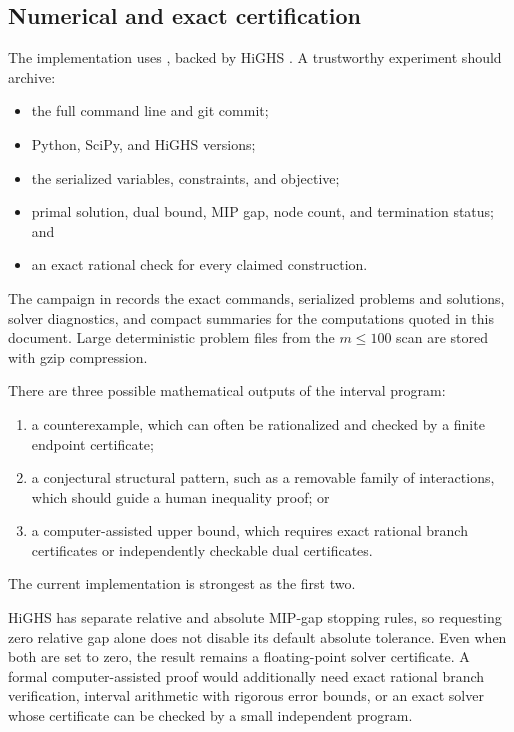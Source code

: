 \subsection{Numerical and exact certification}

The implementation uses , backed by HiGHS
\cite{SciPy2020,HiGHS2020}.  A trustworthy experiment should archive:
\begin{itemize}
    \item the full command line and git commit;
    \item Python, SciPy, and HiGHS versions;
    \item the serialized variables, constraints, and objective;
    \item primal solution, dual bound, MIP gap, node count, and termination
          status; and
    \item an exact rational check for every claimed construction.
\end{itemize}

The campaign in  records the exact
commands, serialized problems and solutions, solver diagnostics, and compact
summaries for the computations quoted in this document.  Large deterministic
problem files from the \(m\leq100\) scan are stored with gzip compression.

There are three possible mathematical outputs of the interval program:
\begin{enumerate}
    \item a counterexample, which can often be rationalized and checked by a
          finite endpoint certificate;
    \item a conjectural structural pattern, such as a removable family of
          interactions, which should guide a human inequality proof; or
    \item a computer-assisted upper bound, which requires exact rational
          branch certificates or independently checkable dual certificates.
\end{enumerate}
The current implementation is strongest as the first two.

HiGHS has separate relative and absolute MIP-gap stopping rules, so requesting
zero relative gap alone does not disable its default absolute tolerance.  Even
when both are set to zero, the result remains a floating-point solver
certificate.  A formal computer-assisted proof would additionally need exact
rational branch verification, interval arithmetic with rigorous error bounds,
or an exact solver whose certificate can be checked by a small independent
program.

